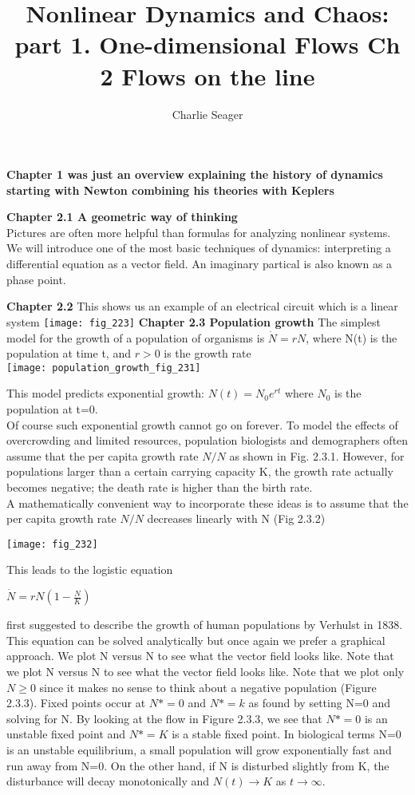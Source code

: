 \documentclass{article}
\begin{document}
\title {Nonlinear Dynamics and Chaos: part 1. One-dimensional Flows Ch 2 Flows on the line}

\author{Charlie Seager}

\maketitle

\textbf {Chapter 1 was just an overview explaining the history of dynamics starting with Newton combining his theories with Keplers}

\textbf {Chapter 2.1 A geometric way of thinking} \\ Pictures are often more helpful than formulas for analyzing nonlinear systems. We will introduce one of the most basic techniques of dynamics: interpreting a differential equation as a vector field. An imaginary partical is also known as a phase point.

\textbf {Chapter 2.2} This shows us an example of an electrical circuit which is a linear system
\texttt{[image: fig\_223]}
\textbf {Chapter 2.3 Population growth} 
The simplest model for the growth of a population of organisms is $\dot{N} = rN$, where N(t) is the population at time t, and $r > 0$ is the growth rate  \\
\texttt{[image: population\_growth\_fig\_231]}

This model predicts exponential growth: $N(t) = N_{0}e^{rt}$ where $N_{0}$ is the population at t=0. \\
Of course such exponential growth cannot go on forever. To model the effects of overcrowding and limited resources, population biologists and demographers often assume that the per capita growth rate $N/N$ as shown in Fig. 2.3.1. However, for populations larger than a certain carrying capacity K, the growth rate actually becomes negative; the death rate is higher than the birth rate. \\
A mathematically convenient way to incorporate these ideas is to assume that the per capita growth rate $N/N$ decreases linearly with N (Fig 2.3.2)

\texttt{[image: fig\_232]}

This leads to the logistic equation 
\begin{center}
$\dot{N} = rN(1-\frac{N}{K})$
\end{center}
first suggested to describe the growth of human populations by Verhulst in 1838. This equation can be solved analytically but once again we prefer a graphical approach. We plot N versus N to see what the vector field looks like. Note that we plot N versus N to see what the vector field looks like. Note that we plot only $N \geq 0$ since it makes no sense to think about a negative population (Figure 2.3.3). Fixed points occur at $N* = 0$ and $N* = k$ as found by setting N=0 and solving for N. By looking at the flow in Figure 2.3.3, we see that $N*=0$ is an unstable fixed point and $N* = K$ is a stable fixed point. In biological terms N=0 is an unstable equilibrium, a small population will grow exponentially fast and run away from N=0. On the other hand, if N is disturbed slightly from K, the disturbance will decay monotonically and $N(t) \to K$ as $t \to \infty$.
\end{document}
